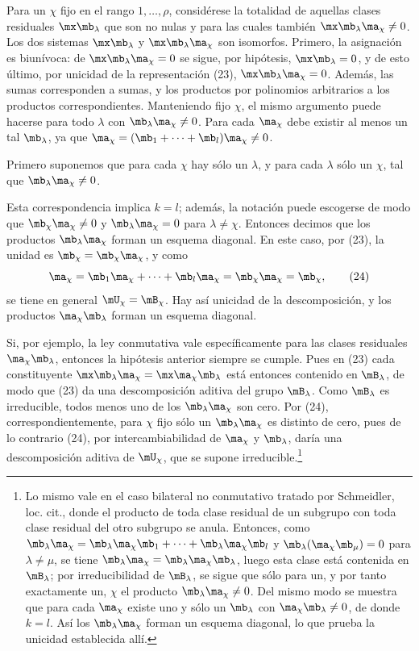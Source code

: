 \documentclass[11pt]{article}
\begin{document}
Para un $\chi$ fijo en el rango $1,\ldots,\rho$, considérese la totalidad de aquellas clases residuales $\mx\mb_\lambda$ que son no nulas y para las cuales también $\mx\mb_\lambda\ma_\chi\ne0$. Los dos sistemas $\mx\mb_\lambda$ y $\mx\mb_\lambda\ma_\chi$ son isomorfos. Primero, la asignación es biunívoca: de $\mx\mb_\lambda\ma_\chi=0$ se sigue, por hipótesis, $\mx\mb_\lambda=0$, y de esto último, por unicidad de la representación (23), $\mx\mb_\lambda\ma_\chi=0$. Además, las sumas corresponden a sumas, y los productos por polinomios arbitrarios a los productos correspondientes. Manteniendo fijo $\chi$, el mismo argumento puede hacerse para todo $\lambda$ con $\mb_\lambda\ma_\chi\ne0$. Para cada $\ma_\chi$ debe existir al menos un tal $\mb_\lambda$, ya que $\ma_\chi=(\mb_1+\cdots+\mb_l)\ma_\chi\ne0$.

Primero suponemos que para cada $\chi$ hay sólo un $\lambda$, y para cada $\lambda$ sólo un $\chi$, tal que $\mb_\lambda\ma_\chi\ne0$.

Esta correspondencia implica $k=l$; además, la notación puede escogerse de modo que $\mb_\chi\ma_\chi\ne0$ y $\mb_\lambda\ma_\chi=0$ para $\lambda\ne\chi$. Entonces decimos que los productos $\mb_\lambda\ma_\chi$ forman un esquema diagonal. En este caso, por (23), la unidad es $\mb_\chi=\mb_\chi\ma_\chi$, y como
\begin{equation}
 \ma_\chi=\mb_1\ma_\chi+\cdots+\mb_l\ma_\chi=\mb_\chi\ma_\chi=\mb_\chi,
\tag{24}
\end{equation}
se tiene en general $\mU_\chi=\mB_\chi$. Hay así unicidad de la descomposición, y los productos $\ma_\chi\mb_\lambda$ forman un esquema diagonal.

Si, por ejemplo, la ley conmutativa vale específicamente para las clases residuales $\ma_\chi\mb_\lambda$, entonces la hipótesis anterior siempre se cumple. Pues en (23) cada constituyente $\mx\mb_\lambda\ma_\chi=\mx\ma_\chi\mb_\lambda$ está entonces contenido en $\mB_\lambda$, de modo que (23) da una descomposición aditiva del grupo $\mB_\lambda$. Como $\mB_\lambda$ es irreducible, todos menos uno de los $\mb_\lambda\ma_\chi$ son cero. Por (24), correspondientemente, para $\chi$ fijo sólo un $\mb_\lambda\ma_\chi$ es distinto de cero, pues de lo contrario (24), por intercambiabilidad de $\ma_\chi$ y $\mb_\lambda$, daría una descomposición aditiva de $\mU_\chi$, que se supone irreducible.\footnote{Lo mismo vale en el caso bilateral no conmutativo tratado por Schmeidler, loc. cit., donde el producto de toda clase residual de un subgrupo con toda clase residual del otro subgrupo se anula. Entonces, como $\mb_\lambda\ma_\chi=\mb_\lambda\ma_\chi\mb_1+\cdots+\mb_\lambda\ma_\chi\mb_l$ y $\mb_\lambda(\ma_\chi\mb_\mu)=0$ para $\lambda\ne\mu$, se tiene $\mb_\lambda\ma_\chi=\mb_\lambda\ma_\chi\mb_\lambda$, luego esta clase está contenida en $\mB_\lambda$; por irreducibilidad de $\mB_\lambda$, se sigue que sólo para un, y por tanto exactamente un, $\chi$ el producto $\mb_\lambda\ma_\chi\ne0$. Del mismo modo se muestra que para cada $\ma_\chi$ existe uno y sólo un $\mb_\lambda$ con $\ma_\chi\mb_\lambda\ne0$, de donde $k=l$. Así los $\mb_\lambda\ma_\chi$ forman un esquema diagonal, lo que prueba la unicidad establecida allí.}
\end{document}

